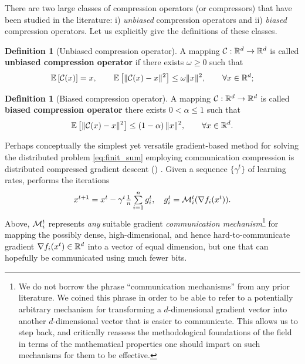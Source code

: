 \documentclass[nohyperref]{article}
\theoremstyle{plain}
\theoremstyle{definition}
\newtheorem{definition}[theorem]{Definition}
\theoremstyle{remark}
\begin{document}
There are two large classes of compression operators (or compressors) that have been studied in the literature: i) \emph{unbiased} compression operators and ii) \emph{biased} compression operators. Let us explicitly give the definitions of these classes.
\begin{definition}[Unbiased compression operator]
A mapping $\mathcal{C}: \mathbb R^d \rightarrow \mathbb R^d$ is called \textbf{unbiased compression operator} if there exists $\omega\geq 0$ such that 
\begin{eqnarray}\label{eq:ub_compressor}
	{\mathbb E}\left[\mathcal{C}(x)\right]=x, \qquad  {\mathbb E}\left[\|\mathcal{C}(x) - x\|^{2}\right]\leq \omega \|x\|^{2}, \qquad \forall x\in \mathbb R^d;
\end{eqnarray}
\end{definition}
\begin{definition}[Biased compression operator]
A mapping $\mathcal{C}: \mathbb R^d \rightarrow \mathbb R^d$ is called \textbf{biased compression operator} there exists $0<\alpha\leq 1$ such that 
\begin{eqnarray}\label{eq:b_compressor}
	{\mathbb E}\left[\|\mathcal{C}(x) - x\|^{2}\right] \leq \left(1 - \alpha\right) \|x\|^{2}, \qquad \forall x\in \mathbb R^d.
\end{eqnarray}
\end{definition}

Perhaps conceptually the simplest yet versatile  gradient-based method for solving the distributed problem  \eqref{eq:finit_sum} employing communication compression is distributed compressed gradient descent ()  \cite{DCGD}. Given a sequence  $\{\gamma^t\}$ of learning rates,  performs the iterations \begin{equation}\label{eq:DCGD} \textstyle x^{t+1} = x^t - \gamma^t \frac{1}{n}\sum \limits_{i=1}^n g_i^t, \quad g_i^t = {\cal M}_i^t(\nabla f_i(x^t)).\end{equation}
Above, ${\cal M}_i^t$ represents {\em any} suitable gradient {\em communication mechanism}\footnote{\scriptsize We do not borrow the phrase ``communication mechanisms'' from any prior literature. We coined this phrase in order to be able to refer to a potentially arbitrary mechanism for transforming a $d$-dimensional gradient vector into another $d$-dimensional vector that is easier to communicate. This allows us to step back, and critically reassess the methodological foundations of the field in terms of the mathematical properties one should impart on such mechanisms for them to be effective.} for mapping the  possibly dense, high-dimensional, and hence hard-to-communicate gradient $\nabla f_i(x^t) \in \mathbb R^d$ into a vector of equal dimension, but one that can hopefully be communicated using much fewer bits. 
\end{document}
